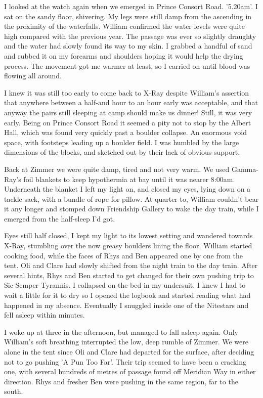 \documentclass[onecolumn]{book}
\begin{document}
I looked at the watch again when we emerged in Prince Consort Road. '5.20am'. I sat on the sandy floor, shivering. My legs were still damp from the ascending in the proximity of the waterfalls. William confirmed the water levels were quite high compared with the previous year. The passage was ever so slightly draughty and the water had slowly found its way to my skin. I grabbed a handful of sand and rubbed it on my forearms and shoulders hoping it would help the drying process. The movement got me warmer at least, so I carried on until blood was flowing all around. 

I knew it was still too early to come back to X-Ray despite William's assertion that anywhere between a half-and hour to an hour early was acceptable, and that anyway the pairs still sleeping at camp should make us dinner! Still, it was very early. Being on Prince Consort Road it seemed a pity not to stop by the Albert Hall, which was found very quickly past a boulder collapse. An enormous void space, with footsteps leading up a boulder field. I was humbled by the large dimensions of the blocks, and sketched out by their lack of obvious support. 

Back at Zimmer we were quite damp, tired and not very warm. We used Gamma-Ray's foil blankets to keep hypothermia at bay until it was nearer 8:00am. Underneath the blanket I left my light on, and closed my eyes, lying down on a tackle sack, with a bundle of rope for pillow. At quarter to, William couldn't bear it any longer and stomped down Friendship Gallery to wake the day train, while I emerged from the half-sleep I'd got. 

Eyes still half closed, I kept my light to its lowest setting and wandered towards X-Ray, stumbling over the now greasy boulders lining the floor. William started cooking food, while the faces of Rhys and Ben appeared one by one from the tent. Oli and Clare had slowly shifted from the night train to the day train. After several hints, Rhys and Ben started to get changed for their own pushing trip to Sic Semper Tyrannis. I collapsed on the bed in my undersuit. I knew I had to wait a little for it to dry so I opened the logbook and started reading what had happened in my absence. Eventually I snuggled inside one of the Nitestars and fell asleep within minutes.

I woke up at three in the afternoon, but managed to fall asleep again. Only William's soft breathing interrupted the low, deep rumble of Zimmer. We were alone in the tent since Oli and Clare had departed for the surface, after deciding not to go pushing 'A Pun Too Far'. Their trip seemed to have been a cracking one, with several hundreds of metres of passage found off Meridian Way in either direction. Rhys and fresher Ben were pushing in the same region, far to the south.
\end{document}
